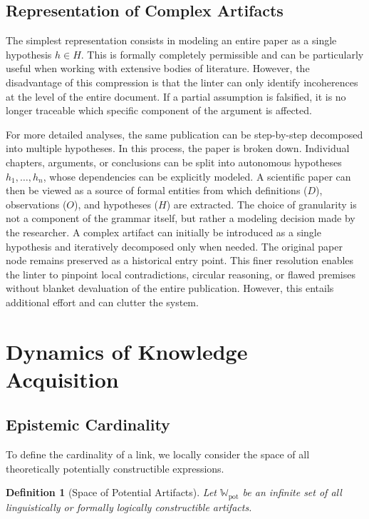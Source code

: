 \documentclass[11pt, a4paper]{article}
\newtheorem{definition}{Definition}
\begin{document}
	\subsection{Representation of Complex Artifacts}
	The simplest representation consists in modeling an entire paper as a single hypothesis $h \in H$. This is formally completely permissible and can be particularly useful when working with extensive bodies of literature. However, the disadvantage of this compression is that the linter can only identify incoherences at the level of the entire document. If a partial assumption is falsified, it is no longer traceable which specific component of the argument is affected.
	
	For more detailed analyses, the same publication can be step-by-step decomposed into multiple hypotheses. In this process, the paper is broken down. Individual chapters, arguments, or conclusions can be split into autonomous hypotheses $h_1,\dots,h_n$, whose dependencies can be explicitly modeled. A scientific paper can then be viewed as a source of formal entities from which definitions ($D$), observations ($O$), and hypotheses ($H$) are extracted. The choice of granularity is not a component of the grammar itself, but rather a modeling decision made by the researcher. A complex artifact can initially be introduced as a single hypothesis and iteratively decomposed only when needed. The original paper node remains preserved as a historical entry point. This finer resolution enables the linter to pinpoint local contradictions, circular reasoning, or flawed premises without blanket devaluation of the entire publication. However, this entails additional effort and can clutter the system.
	
	\section{Dynamics of Knowledge Acquisition}
	
	\subsection{Epistemic Cardinality}
	To define the cardinality of a link, we locally consider the space of all theoretically potentially constructible expressions.
	
	\begin{definition}[Space of Potential Artifacts]
		Let $\mathbb{W}_{\text{pot}}$ be an infinite set of all linguistically or formally logically constructible artifacts.
	\end{definition}
	
\end{document}
